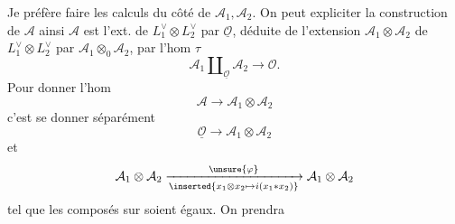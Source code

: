 Je préfère faire les calculs du côté de $\mathcal A_1,\mathcal A_2$.
On peut expliciter la construction de $\mathcal A$ ainsi
$\mathcal A$  est l'ext. de $L_1^\vee\otimes L_2^\vee$ par $\underline{\mathcal O}$, déduite de l'extension $\mathcal A_1\otimes\mathcal A_2$ de $L_1^\vee\otimes L_2^\vee$ par $\mathcal A_1\otimes_0\mathcal A_2$, par l'hom $\tau$
\[
\mathcal A_1\amalg_{\underline{\mathcal O}}\mathcal A_2\longrightarrow\mathcal O.
\]
Pour donner l'hom
\[
\mathcal A\longrightarrow\mathcal A_1\otimes\mathcal A_2
\]
c'est se donner séparément
\[
\underline{\mathcal O}\longrightarrow\mathcal A_1\otimes\mathcal A_2
\]
et
\[
\mathcal A_1\otimes\mathcal A_2\xrightarrow[\inserted{x_1\otimes x_2\mapsto i(x_1*x_2)}]{\unsure{\varphi}}\mathcal A_1\otimes\mathcal A_2
\]
tel que les composés sur
soient égaux. On prendra
